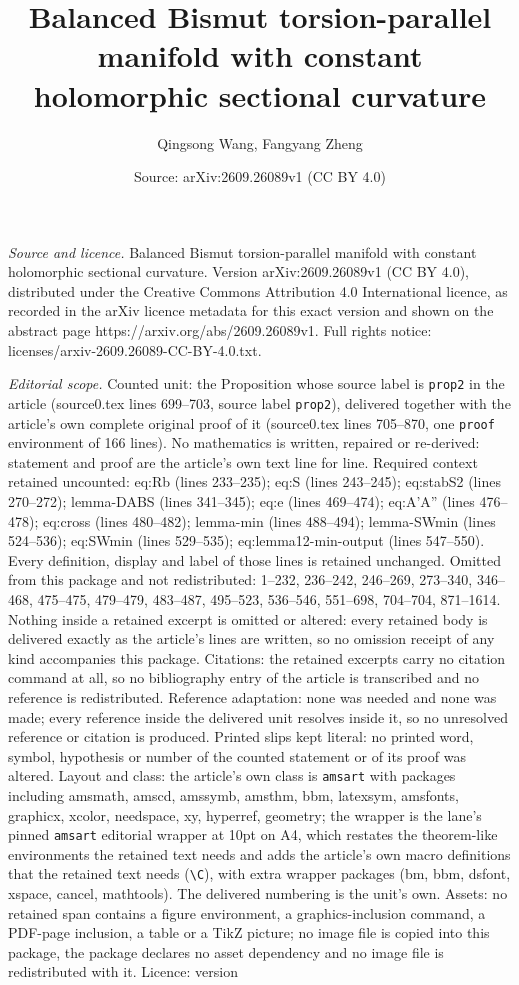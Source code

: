 \documentclass[10pt,a4paper]{amsart}
\title[Balanced Bismut torsion-parallel manifold with constant holo]{Balanced Bismut torsion-parallel manifold with constant holomorphic sectional curvature}
\author{Qingsong Wang, Fangyang Zheng}
\date{Source: arXiv:2609.26089v1 (CC BY 4.0)}
\begin{document}
\maketitle

\noindent\emph{Source and licence.} Balanced Bismut torsion-parallel manifold with constant holomorphic sectional curvature. Version arXiv:2609.26089v1 (CC BY 4.0), distributed under the Creative Commons Attribution 4.0 International licence, as recorded in the arXiv licence metadata for this exact version and shown on the abstract page https://arxiv.org/abs/2609.26089v1. Full rights notice: licenses/arxiv-2609.26089-CC-BY-4.0.txt.\par\smallskip

\noindent\textit{Editorial scope.} Counted unit: the Proposition whose source label is \texttt{prop2} in the article (source0.tex lines 699--703, source label \texttt{prop2}), delivered together with the article's own complete original proof of it (source0.tex lines 705--870, one \texttt{proof} environment of 166 lines). No mathematics is written, repaired or re-derived: statement and proof are the article's own text line for line. Required context retained uncounted: eq:Rb (lines 233--235); eq:S (lines 243--245); eq:stabS2 (lines 270--272); lemma-DABS (lines 341--345); eq:e (lines 469--474); eq:A'A'' (lines 476--478); eq:cross (lines 480--482); lemma-min (lines 488--494); lemma-SWmin (lines 524--536); eq:SWmin (lines 529--535); eq:lemma12-min-output (lines 547--550). Every definition, display and label of those lines is retained unchanged. Omitted from this package and not redistributed: 1--232, 236--242, 246--269, 273--340, 346--468, 475--475, 479--479, 483--487, 495--523, 536--546, 551--698, 704--704, 871--1614. Nothing inside a retained excerpt is omitted or altered: every retained body is delivered exactly as the article's lines are written, so no omission receipt of any kind accompanies this package. Citations: the retained excerpts carry no citation command at all, so no bibliography entry of the article is transcribed and no reference is redistributed. Reference adaptation: none was needed and none was made; every reference inside the delivered unit resolves inside it, so no unresolved reference or citation is produced. Printed slips kept literal: no printed word, symbol, hypothesis or number of the counted statement or of its proof was altered. Layout and class: the article's own class is \texttt{amsart} with packages including amsmath, amscd, amssymb, amsthm, bbm, latexsym, amsfonts, graphicx, xcolor, needspace, xy, hyperref, geometry; the wrapper is the lane's pinned \texttt{amsart} editorial wrapper at 10pt on A4, which restates the theorem-like environments the retained text needs and adds the article's own macro definitions that the retained text needs (\texttt{\textbackslash C}), with extra wrapper packages (bm, bbm, dsfont, xspace, cancel, mathtools). The delivered numbering is the unit's own. Assets: no retained span contains a figure environment, a graphics-inclusion command, a PDF-page inclusion, a table or a TikZ picture; no image file is copied into this package, the package declares no asset dependency and no image file is redistributed with it. Licence: version 
\end{document}
